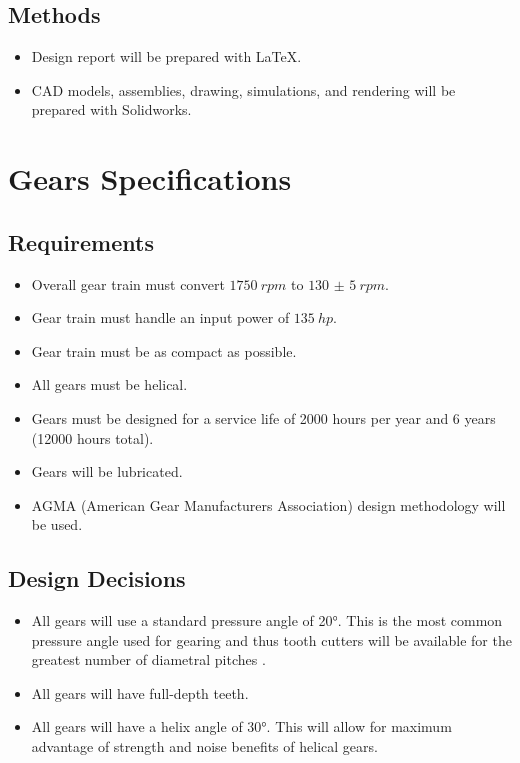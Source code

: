 \documentclass[titlepage]{article} %
\begin{document}
\subsection{Methods}
\begin{itemize}
    \item Design report will be prepared with \LaTeX.
    \item CAD models, assemblies, drawing, simulations, and rendering will be
    prepared with Solidworks. 
\end{itemize}


\section{Gears Specifications}

\subsection{Requirements}
\begin{itemize}
    \item Overall gear train must convert $\SI{1750}{rpm}$ to $\SI{130(5)}{rpm}$.
    \item Gear train must handle an input power of $\SI{135}{hp}$.
    \item Gear train must be as compact as possible.
    \item All gears must be helical.
    \item Gears must be designed for a service life of \num{2000} hours per year
    and 6 years (\num{12000} hours total).
    \item Gears will be lubricated.
    \item AGMA (American Gear Manufacturers Association) design methodology will
    be used.
\end{itemize}

\subsection{Design Decisions}
\begin{itemize}
    \item All gears will use a standard pressure angle of \ang{20}. This is the
    most common pressure angle used for gearing and thus tooth cutters will be
    available for the greatest number of diametral pitches \cite{shigleydesign}.
    \item All gears will have full-depth teeth.
    \item All gears will have a helix angle of \ang{30}. This will allow for
    maximum advantage of strength and noise benefits of helical gears.
\end{itemize}
\end{document}
